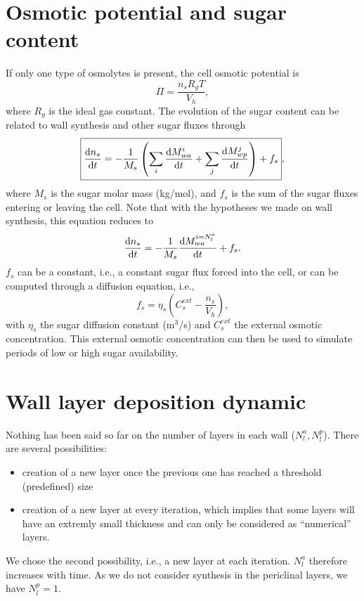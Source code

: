 \documentclass[]{article}
\begin{document}
\section{Osmotic potential and sugar content}
If only one type of osmolytes is present, the cell osmotic potential is 
\begin{equation}
	\boxed{
		\Pi = \frac{n_s R_g T}{V_h}},
\end{equation}
where $R_g$ is the ideal gas constant. The evolution of the sugar content can be related to wall synthesis and other sugar fluxes through
\begin{equation}
	\boxed{
		\frac{{\rm d} n_s}{{\rm d} t}=-\frac{1}{M_s}\left(\sum_i\frac{{\rm d} M_{wa}^i}{{\rm d} t}+\sum_j\frac{{\rm d} M_{wp}^j}{{\rm d} t}\right) + f_s},
\end{equation}
where $M_s$ is the sugar molar mass (kg/mol), and $f_s$ is the sum of the sugar fluxes entering or leaving the cell.
Note that with the hypotheses we made on wall synthesis, this equation reduces to
\begin{equation}
		\frac{{\rm d} n_s}{{\rm d} t}=-\frac{1}{M_s}\frac{{\rm d} M_{wa}^{i=N_l^a}}{{\rm d} t} + f_s.
\end{equation}
 $f_s$ can be a constant, i.e., a constant sugar flux forced into the cell, or can be computed through a diffusion equation, i.e.,
\begin{equation}
	\boxed{
		f_s = \eta_s \left(C_s^{ext} - \frac{n_s}{V_h} \right)},
\end{equation}
with $\eta_s$ the sugar diffusion constant (m$^3$/s) and $C_s^{ext}$ the external osmotic concentration. This external osmotic concentration can then be used to simulate periods of low or high sugar availability. 
\section{Wall layer deposition dynamic}
Nothing has been said so far on the number of layers in each wall ($N_l^a,N_l^p$). There are several possibilities:
\begin{itemize}
	\item creation of a new layer once the previous one has reached a threshold (predefined) size
	\item creation of a new layer at every iteration, which implies that some layers will have an extremly small thickness and can only be considered as ``numerical'' layers.
\end{itemize}
We chose the second possibility, i.e., a new layer at each iteration. $N_l^a$ therefore increases with time. As we do not consider synthesis in the periclinal layers, we have $N_l^p=1$.\\
\end{document}
